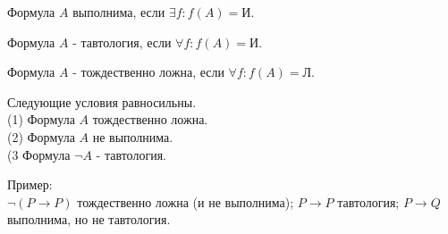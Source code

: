 \vskip 0.2in
\begin{defn}
Формула $A$ выполнима, если $\exists f: f(A)=\text{И}$.
\end{defn}
\begin{defn}
Формула $A$ - тавтология, если $\forall f: f(A)=\text{И}$.
\end{defn}
\begin{defn}
Формула $A$ - тождественно ложна, если $\forall f: f(A)=\text{Л}$.
\end{defn}
\vskip 0.2in
\begin{lem}
Следующие условия равносильны.\\
(1) Формула $A$ тождественно ложна.\\
(2) Формула $A$ не выполнима.\\
(3 Формула $\neg A$ - тавтология.
\end{lem}
Пример:\\
$\neg(P \rightarrow P)$ тождественно ложна (и не выполнима); $P \rightarrow P$ тавтология; $P \rightarrow Q$ выполнима, но не тавтология.